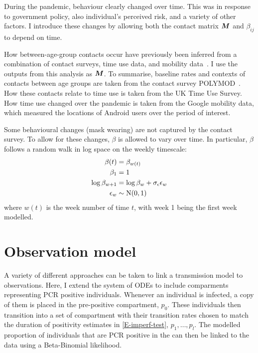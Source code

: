 \documentclass[thesis.tex]{subfiles}
\begin{document}
During the pandemic, behaviour clearly changed over time.
This was in response to government policy, also individual's perceived risk, and a variety of other factors.
I introduce these changes by allowing both the contact matrix $\bm{M}$ and $\beta_{ij}$ to depend on time.

How between-age-group contacts occur have previously been inferred from a combination of contact surveys, time use data, and mobility data~\autocites{vanleeuwenTime}{vanleeuwenAugmenting}.
I use the outputs from this analysis as $\bm{M}$.
To summarise, baseline rates and contexts of contacts between age groups are taken from the contact survey POLYMOD~\autocite{mossongSocial}.
How these contacts relate to time use is taken from the UK Time Use Survey.
How time use changed over the pandemic is taken from the Google mobility data, which measured the locations of Android users over the period of interest.

Some behavioural changes (\eg mask wearing) are not captured by the contact survey.
To allow for these changes, $\beta$ is allowed to vary over time.
In particular, $\beta$ follows a random walk in log space on the weekly timescale:
\begin{align}
    \beta(t) &= \beta_{w(t)} \\
    \beta_1 &= 1 \\
    \log\beta_{w+1} &= \log\beta_w + \sigma_\epsilon \epsilon_w \\
    \epsilon_w &\sim \operatorname{N}(0, 1)
\end{align}
where $w(t)$ is the week number of time $t$, with week 1 being the first week modelled.

\section{Observation model} \label{SEIR:sec:observation}

A variety of different approaches can be taken to link a transmission model to observations.
Here, I extend the system of ODEs to include comparments representing PCR positive individuals.
Whenever an individual is infected, a copy of them is placed in the pre-positive compartment, $p_0$.
These individuals then transition into a set of compartment with their transition rates chosen to match the duration of positivity estimates in \cref{E-imperf-test}, $p_1, \dots, p_l$.
The modelled proportion of individuals that are PCR positive in the can then be linked to the data using a Beta-Binomial likelihood.
\end{document}
